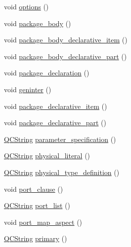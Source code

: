 \begin{DoxyCompactItemize}
\item 
void \hyperlink{classvhdl_1_1parser_1_1_vhdl_parser_aa5fa83c1594fbb550e9b51d8fe51ac4f}{options} ()
\item 
void \hyperlink{classvhdl_1_1parser_1_1_vhdl_parser_a714f42e90273fdb0a57e43182c46e476}{package\+\_\+body} ()
\item 
void \hyperlink{classvhdl_1_1parser_1_1_vhdl_parser_af34fcf8b4bdff8e1bd7d14fc13da00dc}{package\+\_\+body\+\_\+declarative\+\_\+item} ()
\item 
void \hyperlink{classvhdl_1_1parser_1_1_vhdl_parser_a16942334146ae8e7fd047afaf3d459cc}{package\+\_\+body\+\_\+declarative\+\_\+part} ()
\item 
void \hyperlink{classvhdl_1_1parser_1_1_vhdl_parser_a2c7609f6c4636c8b95c3d794d4e5818b}{package\+\_\+declaration} ()
\item 
void \hyperlink{classvhdl_1_1parser_1_1_vhdl_parser_acbabb4cde805eaaa0cd9c20bb15f9162}{geninter} ()
\item 
void \hyperlink{classvhdl_1_1parser_1_1_vhdl_parser_a0b984b0ab753f9053ef8e7b8506b5524}{package\+\_\+declarative\+\_\+item} ()
\item 
void \hyperlink{classvhdl_1_1parser_1_1_vhdl_parser_a0337567bbe6d2a813ab5524c984e4c18}{package\+\_\+declarative\+\_\+part} ()
\item 
\hyperlink{class_q_c_string}{Q\+C\+String} \hyperlink{classvhdl_1_1parser_1_1_vhdl_parser_a7a90314cba51501c366b0e1d9ffb116d}{parameter\+\_\+specification} ()
\item 
\hyperlink{class_q_c_string}{Q\+C\+String} \hyperlink{classvhdl_1_1parser_1_1_vhdl_parser_a260b99ff2039495a59b9189be91d7976}{physical\+\_\+literal} ()
\item 
\hyperlink{class_q_c_string}{Q\+C\+String} \hyperlink{classvhdl_1_1parser_1_1_vhdl_parser_af9357ea0ddbfc064b78c41d377d8042c}{physical\+\_\+type\+\_\+definition} ()
\item 
void \hyperlink{classvhdl_1_1parser_1_1_vhdl_parser_aa5fc31fded8c58a4893a5eb7eabb50ad}{port\+\_\+clause} ()
\item 
\hyperlink{class_q_c_string}{Q\+C\+String} \hyperlink{classvhdl_1_1parser_1_1_vhdl_parser_aae4e4953ff4eb38b059c58b6c6b34716}{port\+\_\+list} ()
\item 
void \hyperlink{classvhdl_1_1parser_1_1_vhdl_parser_ab97a6bd564687fd9d5e62d475da783fb}{port\+\_\+map\+\_\+aspect} ()
\item 
\hyperlink{class_q_c_string}{Q\+C\+String} \hyperlink{classvhdl_1_1parser_1_1_vhdl_parser_a910a96ae30ad337e9a4e665e3fc8618c}{primary} ()

\end{DoxyCompactItemize}
